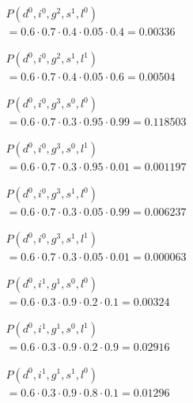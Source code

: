 $\begin{array}{l}
    P(d^0, i^0, g^2, s^1, l^0) \\
    = 0.6 \cdot 0.7 \cdot 0.4 \cdot 0.05 \cdot 0.4 = 0.00336
\end{array}$

$\begin{array}{l}
    P(d^0, i^0, g^2, s^1, l^1) \\
    = 0.6 \cdot 0.7 \cdot 0.4 \cdot 0.05 \cdot 0.6 = 0.00504
\end{array}$

$\begin{array}{l}
    P(d^0, i^0, g^3, s^0, l^0) \\
    = 0.6 \cdot 0.7 \cdot 0.3 \cdot 0.95 \cdot 0.99 = 0.118503
\end{array}$

$\begin{array}{l}
    P(d^0, i^0, g^3, s^0, l^1) \\
    = 0.6 \cdot 0.7 \cdot 0.3 \cdot 0.95 \cdot 0.01 = 0.001197
\end{array}$

$\begin{array}{l}
    P(d^0, i^0, g^3, s^1, l^0) \\
    = 0.6 \cdot 0.7 \cdot 0.3 \cdot 0.05 \cdot 0.99 = 0.006237
\end{array}$

$\begin{array}{l}
    P(d^0, i^0, g^3, s^1, l^1) \\
    = 0.6 \cdot 0.7 \cdot 0.3 \cdot 0.05 \cdot 0.01 = 0.000063
\end{array}$


$\begin{array}{l}
    P(d^0, i^1, g^1, s^0, l^0) \\
    = 0.6 \cdot 0.3 \cdot 0.9 \cdot 0.2 \cdot 0.1 = 0.00324
\end{array}$

$\begin{array}{l}
    P(d^0, i^1, g^1, s^0, l^1) \\
    = 0.6 \cdot 0.3 \cdot 0.9 \cdot 0.2 \cdot 0.9 = 0.02916
\end{array}$

$\begin{array}{l}
    P(d^0, i^1, g^1, s^1, l^0) \\
    = 0.6 \cdot 0.3 \cdot 0.9 \cdot 0.8 \cdot 0.1 = 0.01296
\end{array}$

